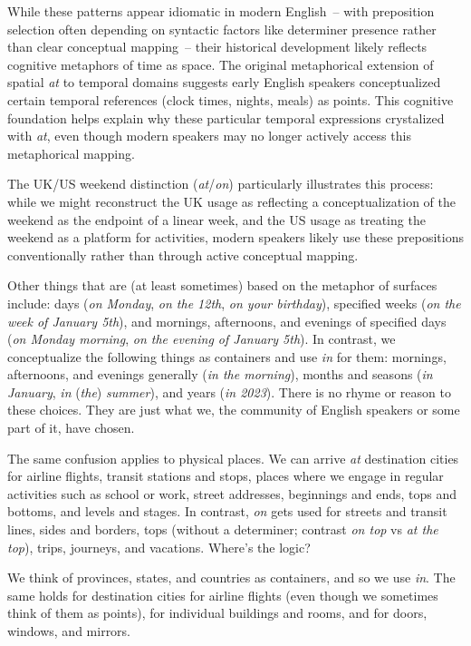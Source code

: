 While these patterns appear idiomatic in modern English~-- with preposition selection often depending on syntactic factors like determiner presence rather than clear conceptual mapping~-- their historical development likely reflects cognitive metaphors of time as space. The original metaphorical extension of spatial \textit{at} to temporal domains suggests early English speakers conceptualized certain temporal references (clock times, nights, meals) as points. This cognitive foundation helps explain why these particular temporal expressions crystalized with \textit{at}, even though modern speakers may no longer actively access this metaphorical mapping.

The UK/US weekend distinction (\textit{at}/\textit{on}) particularly illustrates this process: while we might reconstruct the UK usage as reflecting a conceptualization of the weekend as the endpoint of a linear week, and the US usage as treating the weekend as a platform for activities, modern speakers likely use these prepositions conventionally rather than through active conceptual mapping.

Other things that are (at least sometimes) based on the metaphor of surfaces include: days (\textit{on Monday}, \textit{on the 12th}, \textit{on your birthday}), specified weeks (\textit{on the week of January 5th}), and mornings, afternoons, and evenings of specified days (\textit{on Monday morning}, \textit{on the evening of January 5th}). In contrast, we conceptualize the following things as containers and use \textit{in} for them: mornings, afternoons, and evenings generally (\textit{in the morning}), months and seasons (\textit{in January}, \textit{in }(\textit{the})\textit{ summer}), and years (\textit{in 2023}). There is no rhyme or reason to these choices. They are just what we, the community of English speakers or some part of it, have chosen. 

The same confusion applies to physical places. We can arrive \textit{at} destination cities for airline flights, transit stations and stops, places where we engage in regular activities such as school or work, street addresses, beginnings and ends, tops and bottoms, and levels and stages. In contrast, \textit{on} gets used for streets and transit lines, sides and borders, tops (without a determiner; contrast \textit{on top} vs \textit{at the top}), trips, journeys, and vacations. Where's the logic?

We think of provinces, states, and countries as containers, and so we use \textit{in}. The same holds for destination cities for airline flights (even though we sometimes think of them as points), for individual buildings and rooms, and for doors, windows, and mirrors.


